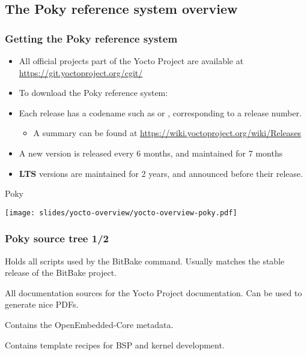 \subsection{The Poky reference system overview}

\begin{frame}
  \frametitle{Getting the Poky reference system}
  \begin{itemize}
    \item All official projects part of the Yocto Project are
          available at \url{https://git.yoctoproject.org/cgit/}
    \item To download the Poky reference system: \\
          {\small
          }
    \item Each release has a codename such as  or ,
	  corresponding to a release number.
		  \begin{itemize}
			  \item A summary can be found at \url{https://wiki.yoctoproject.org/wiki/Releases}
		  \end{itemize}
    \item A new version is released every 6 months, and maintained for 7 months
    \item \textbf{LTS} versions are maintained for 2 years, and announced before their release.

  \end{itemize}
\end{frame}

\begin{frame}{Poky}
  \begin{center}
    \texttt{[image: slides/yocto-overview/yocto-overview-poky.pdf]}
  \end{center}
\end{frame}

\begin{frame}
  \frametitle{Poky source tree 1/2}
  \begin{description}[style=nextline]
  \item[bitbake/] Holds all scripts used by the BitBake command.
    Usually matches the stable release of the BitBake project.
  \item[documentation/] All documentation sources for the Yocto
    Project documentation. Can be used to generate nice PDFs.
  \item[meta/] Contains the OpenEmbedded-Core metadata.
  \item[meta-skeleton/] Contains template recipes for BSP and
    kernel development.
  \end{description}
\end{frame}

